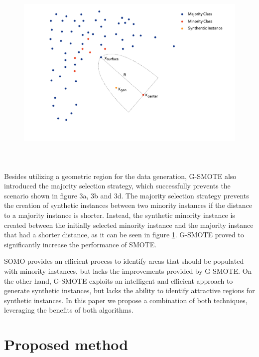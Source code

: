 \documentclass[parskip=full]{scrartcl}
\begin{document}
\begin{figure}[H]
	\centering
	\includegraphics[width=12cm, height=9.5cm, keepaspectratio]{../analysis/fig4.png}
	\label{fig:GSMOTE}
\end{figure}

Besides utilizing a geometric region for the data generation, G-SMOTE also
introduced the majority selection strategy, which successfully prevents the
scenario shown in figure 3a, 3b and 3d. The majority selection strategy prevents
the creation of synthetic instances between two minority instances if the
distance to a majority instance is shorter. Instead, the synthetic minority
instance is created between the initially selected minority instance and the
majority instance that had a shorter distance, as it can be seen in figure \ref{fig:GSMOTE}.
G-SMOTE proved to significantly increase the performance of SMOTE. 

SOMO provides an efficient process to identify areas that should be populated
with minority instances, but lacks the improvements provided by G-SMOTE. On the
other hand, G-SMOTE exploits an intelligent and efficient approach to generate
synthetic instances, but lacks the ability to identify attractive regions for
synthetic instances. In this paper we propose a combination of both techniques,
leveraging the benefits of both algorithms. 

\section{Proposed method}
\end{document}
